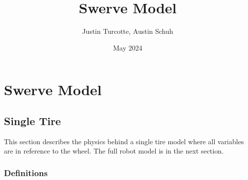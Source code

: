 \documentclass{article}
\title{Swerve Model}
\author{Justin Turcotte, Austin Schuh}
\date{May 2024}
\begin{document}
\maketitle
\tableofcontents
\newpage
\section{Swerve Model}
\subsection{Single Tire}
This section describes the physics behind a single tire model where all variables are in reference to the wheel. The full robot model is in the next section.
\subsubsection{Definitions}
\end{document}
